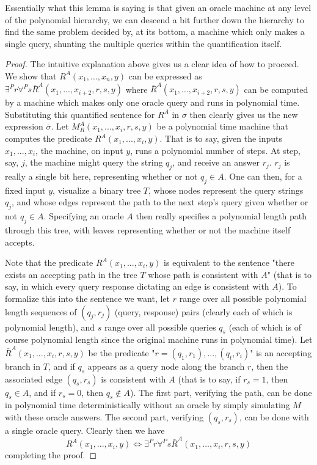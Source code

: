 \documentclass{article}
\theoremstyle{definition}
\theoremstyle{plain}
\theoremstyle{theorem}
\begin{document}
Essentially what this lemma is saying is that given an oracle machine at any level of the polynomial hierarchy, we can descend a bit further down the hierarchy to find the same problem decided by, at its bottom, a machine which only makes a single query, shunting the multiple queries within the quantification itself.
\begin{proof}
	The intuitive explanation above gives us a clear idea of how to proceed. We show that $R^A(x_1,...,x_n,y)$ can be expressed as $\exists^P r \forall^P s \bar{R}^A(x_1,...,x_{i+2},r,s,y)$ where $\bar{R}^A(x_1,...,x_{i+2},r,s,y)$ can be computed by a machine which makes only one oracle query and runs in polynomial time. Substituting this quantified sentence for $R^A$ in $\sigma$ then clearly gives us the new expression $\bar{\sigma}$. Let $M^A_R(x_1,...,x_i,r,s,y)$ be a polynomial time machine that computes the predicate $R^A(x_1,...,x_i,y)$. That is to say, given the inputs $x_1,...,x_i$, the machine, on input $y$, runs a polynomial number of steps. At step, say, $j$, the machine might query the string $q_j$, and receive an answer $r_j$. $r_j$ is really a single bit here, representing whether or not $q_j \in A$. One can then, for a fixed input $y$, visualize a binary tree $T$, whose nodes represent the query strings $q_j$, and whose edges represent the path to the next step's query given whether or not $q_j \in A$. Specifying an oracle $A$ then really specifies a polynomial length path through this tree, with leaves representing whether or not the machine itself accepts. \par 
	Note that the predicate $R^A(x_1,...,x_i,y)$ is equivalent to the sentence "there exists an accepting path in the tree $T$ whose path is consistent with $A$" (that is to say, in which every query response dictating an edge is consistent with $A$). To formalize this into the sentence we want, let $r$ range over all possible polynomial length sequences of $(q_j,r_j)$ (query, response) pairs (clearly each of which is polynomial length), and $s$ range over all possible queries $q_s$ (each of which is of course polynomial length since the original machine runs in polynomial time). Let $\bar{R}^A(x_1,...,x_i,r,s,y)$ be the predicate "$r = (q_1,r_1),...,(q_t,r_i)$" is an accepting branch in $T$, and if $q_s$ appears as a query node along the branch $r$, then the associated edge $(q_s,r_s)$ is consistent with $A$ (that is to say, if $r_s = 1$, then $q_s \in A$, and if $r_s = 0$, then $q_s \notin A$). The first part, verifying the path, can be done in polynomial time deterministically without an oracle by simply simulating $M$ with these oracle answers. The second part, verifying $(q_s,r_s)$, can be done with a single oracle query. Clearly then we have 
	\[ R^A(x_1,...,x_i,y) \iff \exists^P r \forall^P s \bar{R}^A(x_1,...,x_i,r,s,y) \]
	completing the proof.
\end{proof}
\end{document}
